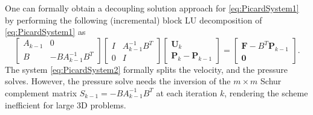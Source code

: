 \documentclass[3p]{elsarticle}
\def\V#1{\mathbf{#1}}
\begin{document}
One can formally obtain a decoupling solution approach for \eqref{eq:PicardSystem1} by performing the following (incremental) block LU decomposition of \eqref{eq:PicardSystem1} as
\begin{equation}\label{eq:PicardSystem2}
\begin{bmatrix} 
A_{k-1} & 0 \\ 
B &  -B A_{k-1}^{-1} B^T 
\end{bmatrix}
\begin{bmatrix} 
I & A^{-1}_{k-1} B^T \\
0 & I 
\end{bmatrix}
\begin{bmatrix} \V{U}_k  \\ 
\V{P}_k - \V{P}_{k-1} 
\end{bmatrix}
= \begin{bmatrix} \V{F} - B^T \V{P}_{k-1} \\ \V{0} \end{bmatrix}. 
\end{equation}
The system \eqref{eq:PicardSystem2} formally splits the velocity, and the pressure solves. However, the pressure solve needs the inversion of the $m\times m$ Schur complement matrix $S_{k-1}=-B A_{k-1}^{-1} B^T$ at each iteration $k$, rendering the scheme inefficient for large 3D problems.
\end{document}
